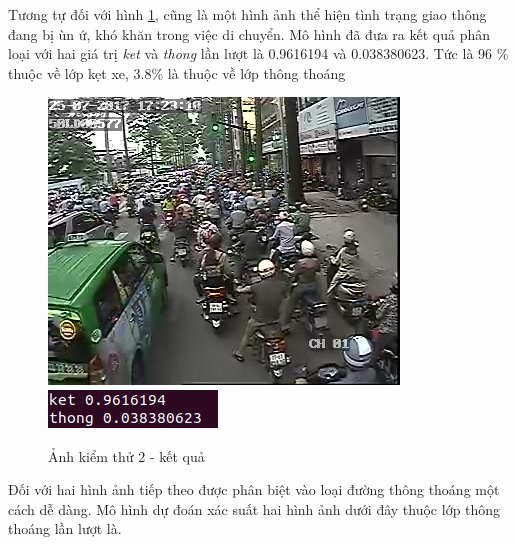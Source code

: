 	Tương tự đối với hình \ref{fig:test2}, cũng là một hình ảnh thể hiện tình trạng giao thông đang bị ùn ứ, khó khăn trong việc di chuyển. Mô hình đã đưa ra kết quả phân loại với hai giá trị \textit{ket} và \textit{thong} lần lượt là 0.9616194 và 0.038380623. Tức là 96 \% thuộc về lớp kẹt xe, 3.8\% là thuộc về lớp thông thoáng
	\begin{figure}[h!]
		\centering
		\includegraphics[scale=1]{charts/test-ket1.jpg}
		\includegraphics[scale=0.5]{charts/test-ket1-res.png}
		\caption{Ảnh kiểm thử 2 - kết quả}
		\label{fig:test2}
	\end{figure}
	
	\pagebreak
	Đối với hai hình ảnh tiếp theo được phân biệt vào loại đường thông thoáng một cách dễ dàng. Mô hình dự đoán xác suất hai hình ảnh dưới đây thuộc lớp thông thoáng lần lượt là. \par 
	
